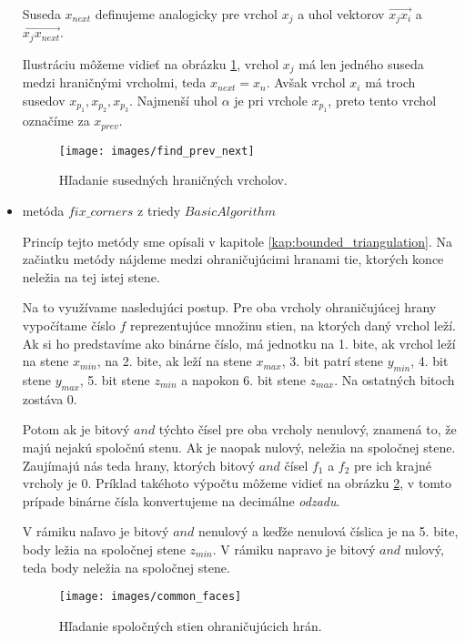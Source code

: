\begin{itemize}
{    Suseda $x_{next}$ definujeme analogicky pre vrchol $x_j$ a uhol vektorov 
    $\overrightarrow{x_j x_i}$ a $\overrightarrow{x_j x_{next}}$.

    Ilustráciu môžeme vidieť na obrázku \ref{obr:find_prev_next}, vrchol $x_j$
    má len jedného suseda medzi hraničnými vrcholmi, teda $x_{next} = x_n$. 
    Avšak vrchol $x_i$ má troch
    susedov $x_{p_1}, x_{p_2}, x_{p_3}$. Najmenší uhol $\alpha$ je pri vrchole $x_{p_1}$,
    preto tento vrchol označíme za $x_{prev}$.

    \begin{figure}
        \centerline{\texttt{[image: images/find\_prev\_next]}}
        \caption[Hľadanie susedných hraničných vrcholov]
        {Hľadanie susedných hraničných vrcholov.}
        \label{obr:find_prev_next}
    \end{figure}
}
\item{
    metóda $fix\_corners$ z triedy $BasicAlgorithm$

    Princíp tejto metódy sme opísali v kapitole \ref{kap:bounded_triangulation}.        
    Na začiatku metódy nájdeme medzi ohraničujúcimi hranami tie, ktorých konce neležia
    na tej istej stene. 
    
    Na to využívame nasledujúci postup. Pre oba vrcholy ohraničujúcej 
    hrany vypočítame číslo $f$ reprezentujúce množinu stien, na ktorých daný vrchol leží. 
    Ak si ho predstavíme ako binárne číslo, má jednotku na 1. bite, ak vrchol leží na stene 
    $x_{min}$, na 2. bite, ak leží na stene $x_{max}$, 3. bit patrí stene $y_{min}$, 4. bit
    stene $y_{max}$, 5. bit stene $z_{min}$ a napokon 6. bit stene $z_{max}$. Na ostatných 
    bitoch zostáva 0. 
    
    Potom ak je bitový $and$ týchto čísel pre oba vrcholy nenulový, znamená
    to, že majú nejakú spoločnú stenu. Ak je naopak nulový, neležia na spoločnej stene.
    Zaujímajú nás teda hrany, ktorých bitový $and$ čísel $f_1$ a $f_2$ pre ich krajné 
    vrcholy je 0. Príklad takéhoto výpočtu môžeme vidieť na obrázku \ref{obr:common_faces}, 
    v tomto prípade binárne čísla konvertujeme na decimálne \textit{odzadu}.

    V rámiku naľavo je bitový $and$ nenulový a keďže nenulová číslica je na 5. bite, body ležia
    na spoločnej stene $z_{min}$. V rámiku napravo je bitový $and$ nulový, teda body neležia
    na spoločnej stene.

    \begin{figure}
        \centerline{\texttt{[image: images/common\_faces]}}
        \caption[Hľadanie spoločných stien ohraničujúcich hrán]
        {Hľadanie spoločných stien ohraničujúcich hrán.}
        \label{obr:common_faces}
    \end{figure}

}
\end{itemize}
